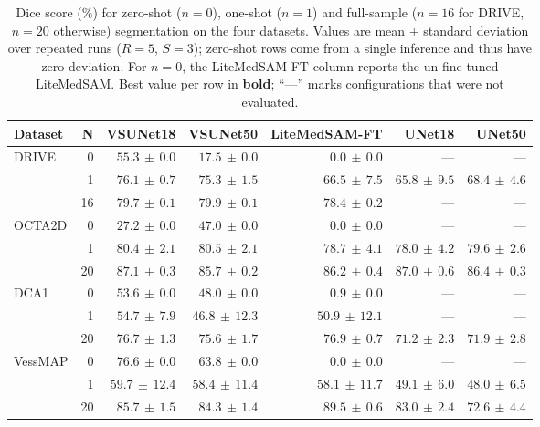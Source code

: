 \documentclass[%
reprint,
nofootinbib,
 amsmath,amssymb,
aps,
superscriptaddress,
showkeys,
longbibliography
]{revtex4-1}
\begin{document}
\begin{table}[t]
    \caption{Dice score (\%) for zero-shot ($n{=}0$), one-shot ($n{=}1$) and full-sample ($n{=}16$ for DRIVE, $n{=}20$ otherwise) segmentation on the four datasets. Values are mean $\pm$ standard deviation over repeated runs ($R{=}5$, $S{=}3$); zero-shot rows come from a single inference and thus have zero deviation. For $n{=}0$, the LiteMedSAM-FT column reports the un-fine-tuned LiteMedSAM. Best value per row in \textbf{bold}; ``---'' marks configurations that were not evaluated.}
    \label{tab:combined_fewshot_percent}
    \centering
    \begingroup
    \small
    \setlength{\tabcolsep}{4pt}
    \renewcommand{\arraystretch}{1.15}
\begin{tabular}{l r r r r r r }
\hline
\textbf{Dataset} & \textbf{N} & \textbf{VSUNet18} & \textbf{VSUNet50} & \textbf{LiteMedSAM-FT} & \textbf{UNet18} & \textbf{UNet50} \\
\hline
\multirow{3}{*}{DRIVE} & 0 & $\mathbf{55.3} \,\pm\, 0.0$ & $17.5 \,\pm\, 0.0$ & $0.0 \,\pm\, 0.0$ & --- & --- \\
 & 1 & $\mathbf{76.1} \,\pm\, 0.7$ & $75.3 \,\pm\, 1.5$ & $66.5 \,\pm\, 7.5$ & $65.8 \,\pm\, 9.5$ & $68.4 \,\pm\, 4.6$ \\
 & 16 & $79.7 \,\pm\, 0.1$ & $\mathbf{79.9} \,\pm\, 0.1$ & $78.4 \,\pm\, 0.2$ & --- & --- \\
\hline
\multirow{3}{*}{OCTA2D} & 0 & $27.2 \,\pm\, 0.0$ & $\mathbf{47.0} \,\pm\, 0.0$ & $0.0 \,\pm\, 0.0$ & --- & --- \\
 & 1 & $80.4 \,\pm\, 2.1$ & $\mathbf{80.5} \,\pm\, 2.1$ & $78.7 \,\pm\, 4.1$ & $78.0 \,\pm\, 4.2$ & $79.6 \,\pm\, 2.6$ \\
 & 20 & $\mathbf{87.1} \,\pm\, 0.3$ & $85.7 \,\pm\, 0.2$ & $86.2 \,\pm\, 0.4$ & $87.0 \,\pm\, 0.6$ & $86.4 \,\pm\, 0.3$ \\
\hline
\multirow{3}{*}{DCA1} & 0 & $\mathbf{53.6} \,\pm\, 0.0$ & $48.0 \,\pm\, 0.0$ & $0.9 \,\pm\, 0.0$ & --- & --- \\
 & 1 & $\mathbf{54.7} \,\pm\, 7.9$ & $46.8 \,\pm\, 12.3$ & $50.9 \,\pm\, 12.1$ & --- & --- \\
 & 20 & $76.7 \,\pm\, 1.3$ & $75.6 \,\pm\, 1.7$ & $\mathbf{76.9} \,\pm\, 0.7$ & $71.2 \,\pm\, 2.3$ & $71.9 \,\pm\, 2.8$ \\
\hline
\multirow{3}{*}{VessMAP} & 0 & $\mathbf{76.6} \,\pm\, 0.0$ & $63.8 \,\pm\, 0.0$ & $0.0 \,\pm\, 0.0$ & --- & --- \\
 & 1 & $\mathbf{59.7} \,\pm\, 12.4$ & $58.4 \,\pm\, 11.4$ & $58.1 \,\pm\, 11.7$ & $49.1 \,\pm\, 6.0$ & $48.0 \,\pm\, 6.5$ \\
 & 20 & $85.7 \,\pm\, 1.5$ & $84.3 \,\pm\, 1.4$ & $\mathbf{89.5} \,\pm\, 0.6$ & $83.0 \,\pm\, 2.4$ & $72.6 \,\pm\, 4.4$ \\
\hline
\end{tabular}
    \endgroup
\end{table}
\end{document}
